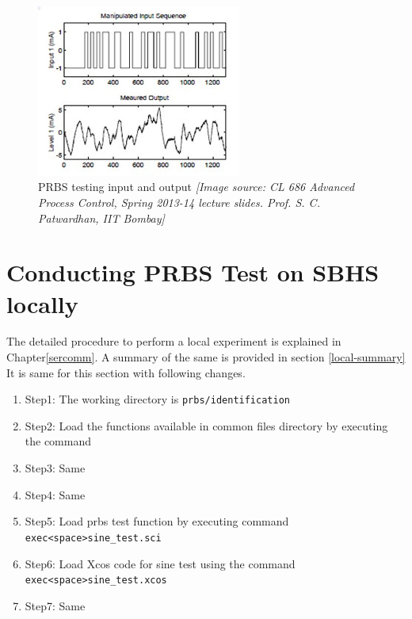 \begin{figure}[H]
\begin{centering}
\includegraphics[width=0.6\textwidth]{prbs/PRBS}
\par\end{centering}

\caption{PRBS testing input and output \textit{{[}Image source: CL 686 Advanced
Process Control, Spring 2013-14 lecture slides. Prof. S. C. Patwardhan, IIT Bombay{]}}}
\label{sample-prbs}
\end{figure}

\section{Conducting PRBS Test on SBHS locally}
The detailed procedure to perform a local experiment is explained in Chapter\ref{sercomm}. A summary of the same is provided in section \ref{local-summary} It is same for this section with following changes.

\begin{enumerate}
\item Step1: The working directory is {\tt  prbs/identification}
\item Step2:  Load the functions available in common files directory by executing the command
\item Step3: Same
\item Step4: Same
\item Step5: Load prbs test function by executing command\\ {\tt exec<space>sine\_test.sci}
\item Step6: Load Xcos code for sine test using the command\\ {\tt exec<space>sine\_test.xcos}
\item Step7: Same
\end{enumerate}



